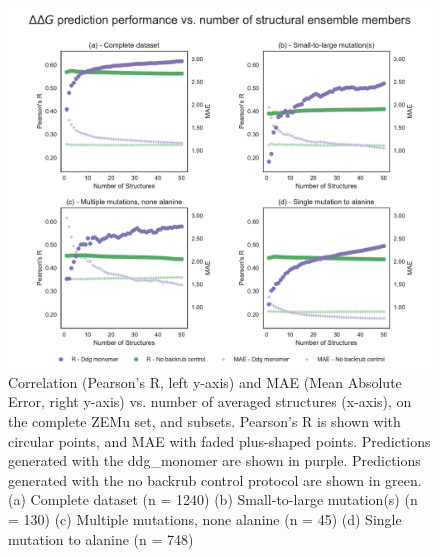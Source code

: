 \begin{figure}
  \includegraphics[width=\textwidth,keepaspectratio]{structs-v-corr-WildTypeComplex-ddg-monomer-16-003-zemu-2.pdf}
  \caption[]{ %
    Correlation (Pearson's R, left y-axis) and MAE (Mean Absolute Error, right y-axis) vs. number of averaged structures (x-axis), on the complete ZEMu set, and subsets.
    Pearson's R is shown with circular points, and MAE with faded plus-shaped points.
    Predictions generated with the ddg\_monomer are shown in purple.
    Predictions generated with the no backrub control protocol are shown in green.
    (a) Complete dataset (n = 1240)
    (b) Small-to-large mutation(s) (n = 130)
    (c) Multiple mutations, none alanine (n = 45)
    (d) Single mutation to alanine (n = 748)
  } \label{fig:structs-v-corr-WildTypeComplex-ddg-monomer-16-003-zemu-2}
\end{figure}
